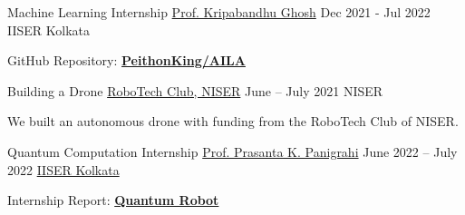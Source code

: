 

		\cvevent
		{Machine Learning Internship}
		{\href{https://www.iiserkol.ac.in/web/en/people/faculty/cds/kripaghosh}{Prof. Kripabandhu Ghosh}}
		{Dec 2021 - Jul 2022}
		{IISER Kolkata}

		\begin{justify}

			GitHub Repository: \href{https://github.com/PeithonKing/AILA}{\textbf{PeithonKing/AILA}}
		\end{justify}
		\divider
 



	\cvevent
	{Building a Drone}
	{\href{https://www.niser.ac.in/~smishra/club/rtc/}{RoboTech Club, NISER}}
	{June -- July 2021}
	{NISER}

	\begin{justify}
		\hspace{5mm} We built an autonomous drone with funding from the RoboTech Club of NISER.
	\end{justify}
	\divider


	\cvevent
	{Quantum Computation Internship}
	{\href{https://www.iiserkol.ac.in/web/en/people/faculty/dps/pprasanta/}{Prof. Prasanta K. Panigrahi}}
	{June 2022 -- July 2022}
	{\href{https://www.iiserkol.ac.in/web/en/}{IISER Kolkata}}

	\begin{justify}

		Internship Report: \href{https://github.com/PeithonKing/Quantum_Robot_LaTEX/blob/main/quantum_robot_internship_report.pdf}{\textbf{Quantum Robot}}
	\end{justify}
	\divider


